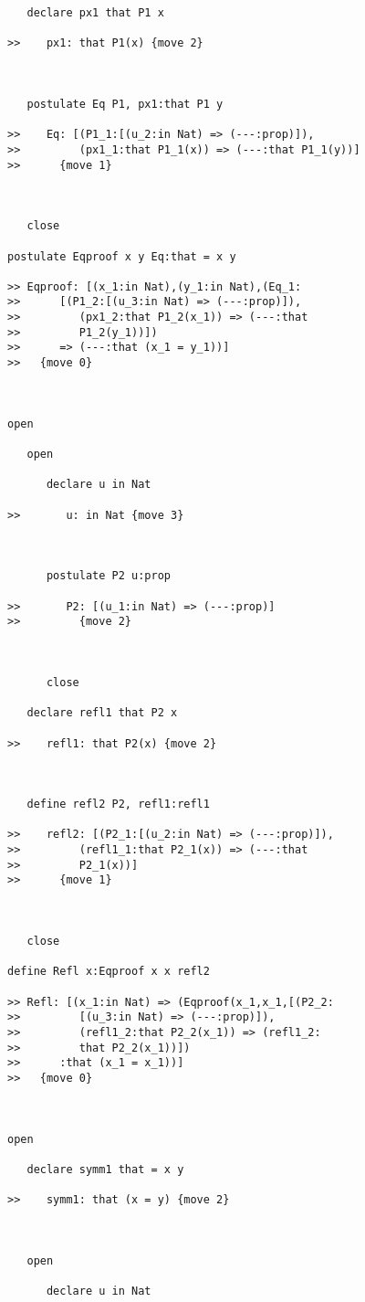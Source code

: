 \begin{verbatim}
   declare px1 that P1 x

>>    px1: that P1(x) {move 2}



   postulate Eq P1, px1:that P1 y

>>    Eq: [(P1_1:[(u_2:in Nat) => (---:prop)]),
>>         (px1_1:that P1_1(x)) => (---:that P1_1(y))]
>>      {move 1}



   close

postulate Eqproof x y Eq:that = x y

>> Eqproof: [(x_1:in Nat),(y_1:in Nat),(Eq_1:
>>      [(P1_2:[(u_3:in Nat) => (---:prop)]),
>>         (px1_2:that P1_2(x_1)) => (---:that
>>         P1_2(y_1))])
>>      => (---:that (x_1 = y_1))]
>>   {move 0}



open

   open

      declare u in Nat

>>       u: in Nat {move 3}



      postulate P2 u:prop

>>       P2: [(u_1:in Nat) => (---:prop)]
>>         {move 2}



      close

   declare refl1 that P2 x

>>    refl1: that P2(x) {move 2}



   define refl2 P2, refl1:refl1

>>    refl2: [(P2_1:[(u_2:in Nat) => (---:prop)]),
>>         (refl1_1:that P2_1(x)) => (---:that
>>         P2_1(x))]
>>      {move 1}



   close

define Refl x:Eqproof x x refl2

>> Refl: [(x_1:in Nat) => (Eqproof(x_1,x_1,[(P2_2:
>>         [(u_3:in Nat) => (---:prop)]),
>>         (refl1_2:that P2_2(x_1)) => (refl1_2:
>>         that P2_2(x_1))])
>>      :that (x_1 = x_1))]
>>   {move 0}



open

   declare symm1 that = x y

>>    symm1: that (x = y) {move 2}



   open

      declare u in Nat


\end{verbatim}
